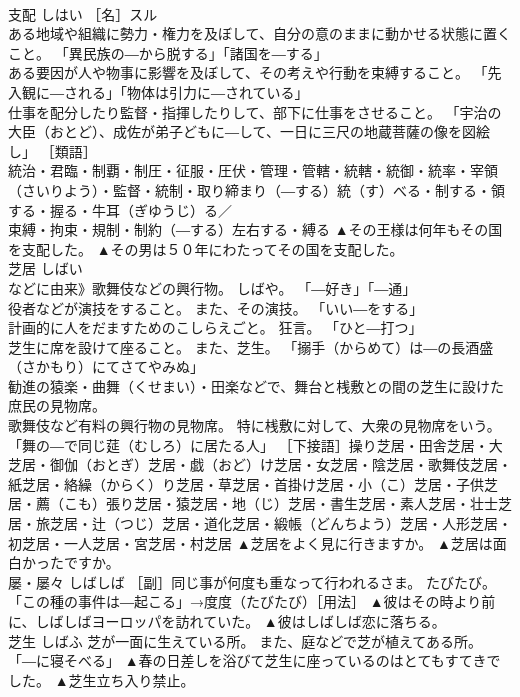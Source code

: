 \documentclass[8pt]{extreport}
\begin{document}
\begin{CJK}{UTF8}{min}
\\	支配	しはい	［名］スル 
\\	ある地域や組織に勢力・権力を及ぼして、自分の意のままに動かせる状態に置くこと。 「異民族の―から脱する」「諸国を―する」 
\\	ある要因が人や物事に影響を及ぼして、その考えや行動を束縛すること。 「先入観に―される」「物体は引力に―されている」 
\\	仕事を配分したり監督・指揮したりして、部下に仕事をさせること。 「宇治の大臣（おとど）、成佐が弟子どもに―して、一日に三尺の地蔵菩薩の像を図絵し」 ［類語］
\\	統治・君臨・制覇・制圧・征服・圧伏・管理・管轄・統轄・統御・統率・宰領（さいりよう）・監督・統制・取り締まり（―する）統（す）べる・制する・領する・握る・牛耳（ぎゆうじ）る／
\\	束縛・拘束・規制・制約（―する）左右する・縛る	▲その王様は何年もその国を支配した。 ▲その男は５０年にわたってその国を支配した。
\\	芝居	しばい	
\\	などに由来》歌舞伎などの興行物。 しばや。 「―好き」「―通」 
\\	役者などが演技をすること。 また、その演技。 「いい―をする」 
\\	計画的に人をだますためのこしらえごと。 狂言。 「ひと―打つ」 
\\	芝生に席を設けて座ること。 また、芝生。 「搦手（からめて）は―の長酒盛（さかもり）にてさてやみぬ」 
\\	勧進の猿楽・曲舞（くせまい）・田楽などで、舞台と桟敷との間の芝生に設けた庶民の見物席。 
\\	歌舞伎など有料の興行物の見物席。 特に桟敷に対して、大衆の見物席をいう。 「舞の―で同じ莚（むしろ）に居たる人」 ［下接語］操り芝居・田舎芝居・大芝居・御伽（おとぎ）芝居・戯（おど）け芝居・女芝居・陰芝居・歌舞伎芝居・紙芝居・絡繰（からく）り芝居・草芝居・首掛け芝居・小（こ）芝居・子供芝居・薦（こも）張り芝居・猿芝居・地（じ）芝居・書生芝居・素人芝居・壮士芝居・旅芝居・辻（つじ）芝居・道化芝居・緞帳（どんちよう）芝居・人形芝居・初芝居・一人芝居・宮芝居・村芝居	▲芝居をよく見に行きますか。 ▲芝居は面白かったですか。
\\	屡・屡々	しばしば	［副］同じ事が何度も重なって行われるさま。 たびたび。 「この種の事件は―起こる」→度度（たびたび）［用法］	▲彼はその時より前に、しばしばヨーロッパを訪れていた。 ▲彼はしばしば恋に落ちる。
\\	芝生	しばふ	芝が一面に生えている所。 また、庭などで芝が植えてある所。 「―に寝そべる」	▲春の日差しを浴びて芝生に座っているのはとてもすてきでした。 ▲芝生立ち入り禁止。

\end{CJK}
\end{document}
